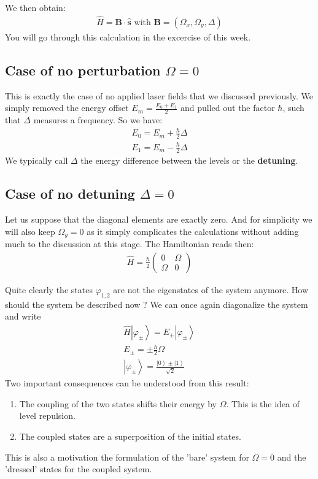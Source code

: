 \documentclass[10pt]{article}
\newcommand{\ket}[1]{\ensuremath{\left|#1\right\rangle}}
\begin{document}
We then obtain:
\begin{align}\label{Eq:HamSpin}
\hat{H} = \mathbf{B}\cdot\hat{\mathbf{s}}\text{ with }\mathbf{B} = (\Omega_x, \Omega_y, \Delta)
\end{align}
You will go through this calculation in the excercise of this week.

\subsection{Case of no perturbation $\Omega = 0$}

This is exactly the case of no applied laser fields that we discussed previously. We simply removed the energy offset $E_m = \frac{E_0+E_1}{2}$ and pulled out the factor $\hbar$, such that $\Delta$ measures a frequency. So we have:
\begin{align}
E_0 = E_m+ \frac{\hbar}{2}\Delta\\
E_1 = E_m- \frac{\hbar}{2}\Delta
\end{align}
We typically call $\Delta$ the energy difference between the levels or the \textbf{detuning}.

\subsection{Case of no detuning $\Delta = 0$}

Let us suppose that the diagonal elements are exactly zero. And for simplicity we will also keep $\Omega_y =0$ as it simply complicates the calculations without adding much to the discussion at this stage. The Hamiltonian reads then:
\begin{align}
\hat{H} = \frac{\hbar}{2}\left( \begin{array}{cc} 0  & \Omega\\ \Omega &0 \end{array} \right)
\end{align}

Quite clearly the states $\varphi_{1,2}$ are not the eigenstates of the system anymore. How should the system be described now ? We can once again diagonalize the system and write
\begin{align}
\hat{H}\ket{\varphi_{\pm}} = E_{\pm}\ket{\varphi_\pm}\\
E_{\pm} = \pm\frac{\hbar}{2}\Omega\\
\ket{\varphi_\pm} = \frac{\ket{0}\pm\ket{1}}{\sqrt{2}}
\end{align}
Two important consequences can be understood from this result:
\begin{enumerate}
\item The coupling of the two states shifts their energy by $\Omega$. This is the idea of level repulsion.
\item The coupled states are a superposition of the initial states.
\end{enumerate}
This is also a motivation the formulation of the 'bare' system for $\Omega = 0$ and the 'dressed' states for the coupled system.
\end{document}
